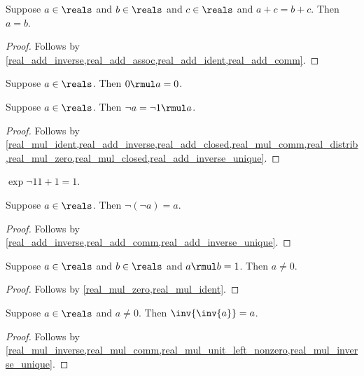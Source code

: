 \begin{proposition}\label{real_add_cancel}
    Suppose $a\in\reals$ and $b\in\reals$ and $c\in\reals$ and $a + c = b + c$.
    Then $a = b$.
\end{proposition}
\begin{proof}
    Follows by \cref{real_add_inverse,real_add_assoc,real_add_ident,real_add_comm}.
\end{proof}

\begin{proposition}\label{real_mul_zero}
    Suppose $a\in\reals$.
    Then $0 \rmul a = 0$.
\end{proposition}

\begin{proposition}\label{real_neg_as_mul}
    Suppose $a\in\reals$.
    Then $\neg{a} = \neg{1} \rmul a$.
\end{proposition}
\begin{proof}
    Follows by \cref{real_mul_ident,real_add_inverse,real_add_closed,real_mul_comm,real_distrib,real_mul_zero,real_mul_closed,real_add_inverse_unique}.
\end{proof}

\begin{proposition}\label{real_neg_one_square}
    $\exp{\neg{1}}{1+1} = 1$.
\end{proposition}

\begin{proposition}\label{real_neg_neg}
    Suppose $a\in\reals$.
    Then $\neg{(\neg{a})} = a$.
\end{proposition}
\begin{proof}
    Follows by \cref{real_add_inverse,real_add_comm,real_add_inverse_unique}.
\end{proof}

\begin{lemma}\label{real_mul_unit_left_nonzero}
    Suppose $a\in\reals$ and $b\in\reals$ and $a \rmul b = 1$.
    Then $a \neq 0$.
\end{lemma}
\begin{proof}
    Follows by \cref{real_mul_zero,real_mul_ident}.
\end{proof}

\begin{proposition}\label{real_inv_inv}
    Suppose $a\in\reals$ and $a\neq 0$.
    Then $\inv{\inv{a}} = a$.
\end{proposition}
\begin{proof}
    Follows by \cref{real_mul_inverse,real_mul_comm,real_mul_unit_left_nonzero,real_mul_inverse_unique}.
\end{proof}

